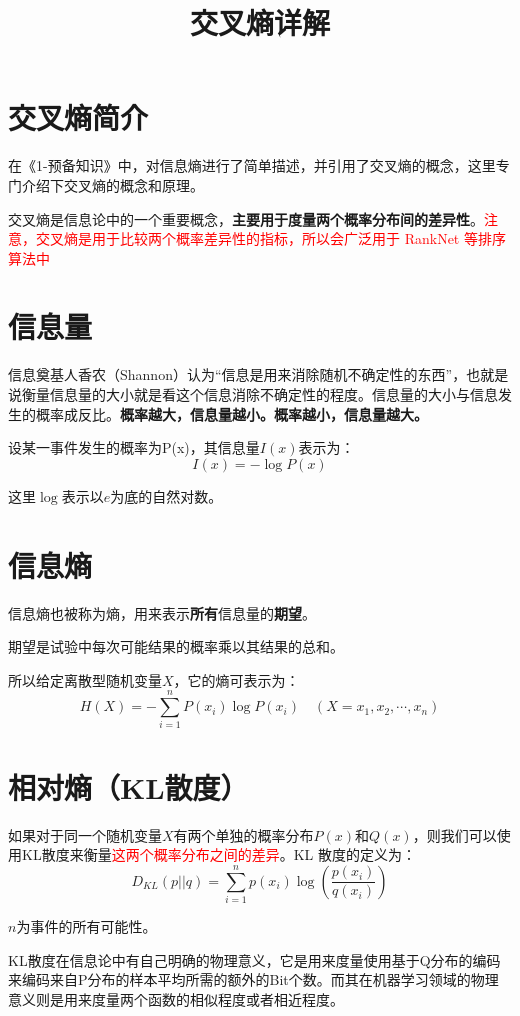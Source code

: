 \documentclass[12pt]{article}
\title{交叉熵详解\cite{CrossEntropy_Detail}}
\begin{document}
\maketitle
\tableofcontents

\section{交叉熵简介\cite{CrossEntropy_Detail}}
在《1-预备知识》中，对信息熵进行了简单描述，并引用了交叉熵的概念，这里专门介绍下交叉熵的概念和原理。

交叉熵是信息论中的一个重要概念，\textbf{主要用于度量两个概率分布间的差异性}。\textcolor{red}{注意，交叉熵是用于比较两个概率差异性的指标，所以会广泛用于 RankNet 等排序算法中}

\section{信息量}
信息奠基人香农（Shannon）认为“信息是用来消除随机不确定性的东西”，也就是说衡量信息量的大小就是看这个信息消除不确定性的程度。信息量的大小与信息发生的概率成反比。\textbf{概率越大，信息量越小。概率越小，信息量越大。}

设某一事件发生的概率为P(x)，其信息量$I(x)$表示为：
$$
I(x) = -\log{P(x)}
$$

这里$\log$表示以$e$为底的自然对数。

\section{信息熵}
信息熵也被称为熵，用来表示\textbf{所有}信息量的\textbf{期望}。

期望是试验中每次可能结果的概率乘以其结果的总和。

所以给定离散型随机变量$X$，它的熵可表示为：
$$
H(X) = -\sum_{i=1}^nP(x_i)\log{P(x_i)} \quad (X = x_1, x_2, \cdots, x_n)
$$

\section{相对熵（KL散度）}
如果对于同一个随机变量$X$有两个单独的概率分布$P(x)$和$Q(x)$，则我们可以使用KL散度来衡量\textcolor{red}{这两个概率分布之间的差异}。KL 散度的定义为：
$$
D_{KL}(p||q) = \sum_{i=1}^np(x_i)\log{(\frac{p(x_i)}{q(x_i)})}
$$

$n$为事件的所有可能性。

KL散度在信息论中有自己明确的物理意义，它是用来度量使用基于Q分布的编码来编码来自P分布的样本平均所需的额外的Bit个数。而其在机器学习领域的物理意义则是用来度量两个函数的相似程度或者相近程度。
\end{document}
